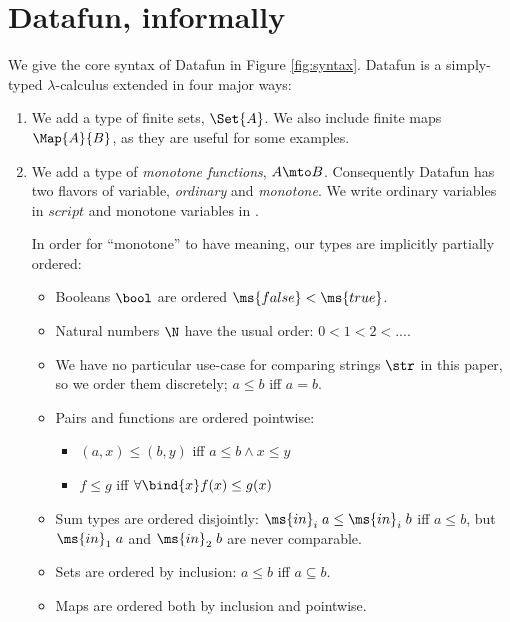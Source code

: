 \section{Datafun, informally}

We give the core syntax of Datafun in Figure \ref{fig:syntax}. Datafun is a
simply-typed $\lambda$-calculus extended in four major ways:

\begin{enumerate}
\item We add a type of finite sets, $\Set{A}$. We also include finite maps
  $\Map{A}{B}$, as they are useful for some examples.



\item We add a type of \emph{monotone functions}, $A \mto B$. Consequently
  Datafun has two flavors of variable, \emph{ordinary} and \emph{monotone}. We
  write ordinary variables in $script$ and monotone variables in .

  In order for ``monotone'' to have meaning, our types are implicitly partially
  ordered:
  \begin{itemize}
  \item Booleans $\bool$ are ordered $\ms{false} < \ms{true}$.
  \item Natural numbers $\N$ have the usual order: $0 < 1 < 2 < ...$.
  \item We have no particular use-case for comparing strings $\str$ in
    this paper, so we order them discretely; $a \le b$ iff $a = b$. 
  \item Pairs and functions are ordered pointwise:
    \begin{itemize}
    \item $(a, x) \le (b, y)$ iff $a \le b \wedge x \le y$
    \item $f \le g$ iff $\forall \bind{x} f(x) \le g(x)$
    \end{itemize}
  \item Sum types are ordered disjointly: $\ms{in}_i\; a \le
    \ms{in}_i\; b$ iff $a \le b$, but $\ms{in}_1\; a$ and $\ms{in}_2\; b$ are
    never comparable.
  \item Sets are ordered by inclusion: $a \le b$ iff $a \subseteq b$.
  \item Maps are ordered both by inclusion and pointwise.
  \end{itemize}


\end{enumerate}
